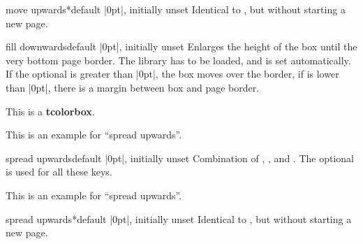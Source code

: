 \begin{docTcbKey}[][doc new=2017-02-13]{move upwards*}{}{default |0pt|, initially unset}
Identical to , but without starting a new page.
\end{docTcbKey}


\begin{docTcbKey}[][doc new=2017-02-13]{fill downwards}{}{default |0pt|, initially unset}
Enlarges the height of the box until the very bottom page border.
The library  has to be loaded, and
 is set automatically.
If the optional  is greater than |0pt|, the box
moves over the border, if  is lower than |0pt|, there is a
margin between box and page border.
\begin{dispListing}
\begin{tcolorbox}[enhanced,fill downwards,
  colframe=blue!75!black,colback=white,show bounding box]
This is a \textbf{tcolorbox}.
\end{tcolorbox}
\end{dispListing}
{\tcbusetemp}
\end{docTcbKey}


\begin{tcolorbox}[enhanced,spread upwards,sharp corners=north,height=3cm,
  colframe=blue!75!black,interior style={top color=blue!50,bottom color=white}]
This is an example for \enquote{spread upwards}.
\end{tcolorbox}
\begin{docTcbKey}[][doc new=2017-02-13]{spread upwards}{}{default |0pt|, initially unset}
Combination of
, , and .
The optional  is used for all these keys.
\begin{dispListing}
\begin{tcolorbox}[enhanced,spread upwards,sharp corners=north,height=3cm,
  colframe=blue!75!black,interior style={top color=blue!50,bottom color=white}]
This is an example for \enquote{spread upwards}.
\end{tcolorbox}
\end{dispListing}
\end{docTcbKey}


\begin{docTcbKey}[][doc new=2017-02-13]{spread upwards*}{}{default |0pt|, initially unset}
Identical to , but without starting a new page.
\end{docTcbKey}



